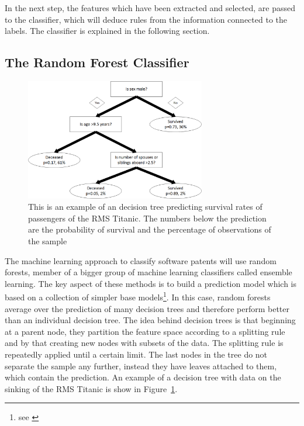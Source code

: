 \documentclass[12pt, a4paper, abstract, parskip]{scrartcl}
\theoremstyle{definition}
\begin{document}
In the next step, the features which have been extracted and selected, are
passed to the classifier, which will deduce rules from the information
connected to the labels. The classifier is explained in the following section.

\subsection{The Random Forest Classifier} %
\label{sub:the_random_forest_classifier}

\begin{figure}[tb]
	\centering
	\includegraphics[width=0.7\textwidth]{graphics/titanic.png}
    \caption{This is an example of an decision tree predicting survival rates
    of passengers of the RMS Titanic. The numbers below the prediction are the
    probability of survival and the percentage of observations of the sample}
	\label{fig:decisiontree}
\end{figure}

The machine learning approach to classify software patents will use random
forests, member of a bigger group of machine learning classifiers called
ensemble learning. The key aspect of these methods is to build a prediction
model which is based on a collection of simpler base models\footnote{see
\citet[Chapter 16]{friedman2009elements}}. In this case, random forests average
over the prediction of many decision trees and therefore perform better than an
individual decision tree. The idea behind decision trees is that beginning at a
parent node, they partition the feature space according to a splitting rule and
by that creating new nodes with subsets of the data. The splitting rule is
repeatedly applied until a certain limit. The last nodes in the tree do not
separate the sample any further, instead they have leaves attached to them,
which contain the prediction. An example of a decision tree with data on the
sinking of the RMS Titanic is show in Figure~\ref{fig:decisiontree}.
\end{document}
